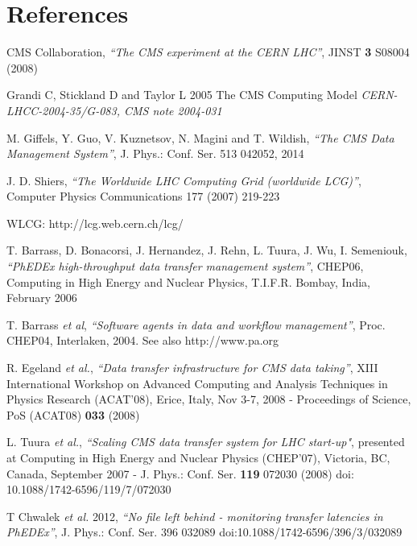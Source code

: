 \section*{References}

\begin{thebibliography}{1}

  CMS Collaboration, {\it ``The CMS experiment at the CERN LHC''}, JINST \textbf{3} S08004 (2008)

  Grandi C, Stickland D and Taylor L 2005 The CMS Computing Model {\it CERN-LHCC-2004-35/G-083, CMS note 2004-031}

  M. Giffels, Y. Guo, V. Kuznetsov, N. Magini and T. Wildish, {\it ``The CMS
  Data Management System''}, J. Phys.: Conf. Ser. 513 042052, 2014

  J. D. Shiers, {\it ``The Worldwide LHC Computing Grid (worldwide LCG)''},
Computer Physics Communications 177 (2007) 219-223

  WLCG: http://lcg.web.cern.ch/lcg/

  T. Barrass, D. Bonacorsi, J. Hernandez, J. Rehn, L. Tuura, J. Wu,
  I. Semeniouk, {\it ``PhEDEx high-throughput data transfer management
  system''}, CHEP06, Computing in High Energy and Nuclear Physics,
  T.I.F.R.  Bombay, India, February 2006

  T. Barrass {\it et al}, {\it ``Software agents in data and workflow
    management''}, Proc. CHEP04, Interlaken, 2004. See also
  http://www.pa.org

  R. Egeland {\it et al.}, {\it ``Data transfer infrastructure for CMS
    data taking''}, XIII International Workshop on Advanced Computing
  and Analysis Techniques in Physics Research (ACAT'08), Erice, Italy,
  Nov 3-7, 2008 - Proceedings of Science, PoS (ACAT08) \textbf{033} (2008)

  L. Tuura {\it et al.}, {\it ``Scaling CMS data transfer system for
    LHC start-up"}, presented at Computing in High Energy and Nuclear
  Physics (CHEP'07), Victoria, BC, Canada, September 2007 - J. Phys.:
  Conf. Ser. \textbf{119} 072030 (2008) doi: 10.1088/1742-6596/119/7/072030

T Chwalek {\it et al.} 2012, {\it ``No file left behind - monitoring
  transfer latencies in PhEDEx''}, J. Phys.: Conf. Ser. 396 032089
doi:10.1088/1742-6596/396/3/032089

\end{thebibliography}
